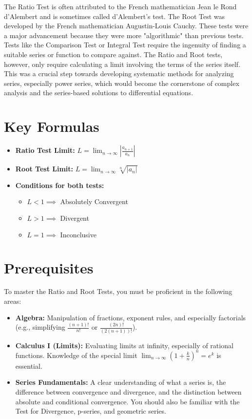 \documentclass{article}
\begin{document}
The Ratio Test is often attributed to the French mathematician Jean le Rond d'Alembert and is sometimes called d'Alembert's test. The Root Test was developed by the French mathematician Augustin-Louis Cauchy. These tests were a major advancement because they were more "algorithmic" than previous tests. Tests like the Comparison Test or Integral Test require the ingenuity of finding a suitable series or function to compare against. The Ratio and Root tests, however, only require calculating a limit involving the terms of the series itself. This was a crucial step towards developing systematic methods for analyzing series, especially power series, which would become the cornerstone of complex analysis and the series-based solutions to differential equations.

\section{Key Formulas}
\begin{itemize}
    \item \textbf{Ratio Test Limit:} $L = \lim_{n \to \infty} \left| \frac{a_{n+1}}{a_n} \right|$
    \item \textbf{Root Test Limit:} $L = \lim_{n \to \infty} \sqrt[n]{|a_n|}$
    \item \textbf{Conditions for both tests:}
        \begin{itemize}
            \item $L < 1 \implies$ Absolutely Convergent
            \item $L > 1 \implies$ Divergent
            \item $L = 1 \implies$ Inconclusive
        \end{itemize}
\end{itemize}

\section{Prerequisites}
To master the Ratio and Root Tests, you must be proficient in the following areas:
\begin{itemize}
    \item \textbf{Algebra:} Manipulation of fractions, exponent rules, and especially factorials (e.g., simplifying $\frac{(n+1)!}{n!}$ or $\frac{(2n)!}{(2(n+1))!}$).
    \item \textbf{Calculus I (Limits):} Evaluating limits at infinity, especially of rational functions. Knowledge of the special limit $\lim_{n \to \infty} (1 + \frac{k}{n})^n = e^k$ is essential.
    \item \textbf{Series Fundamentals:} A clear understanding of what a series is, the difference between convergence and divergence, and the distinction between absolute and conditional convergence. You should also be familiar with the Test for Divergence, p-series, and geometric series.
\end{itemize}
\end{document}
